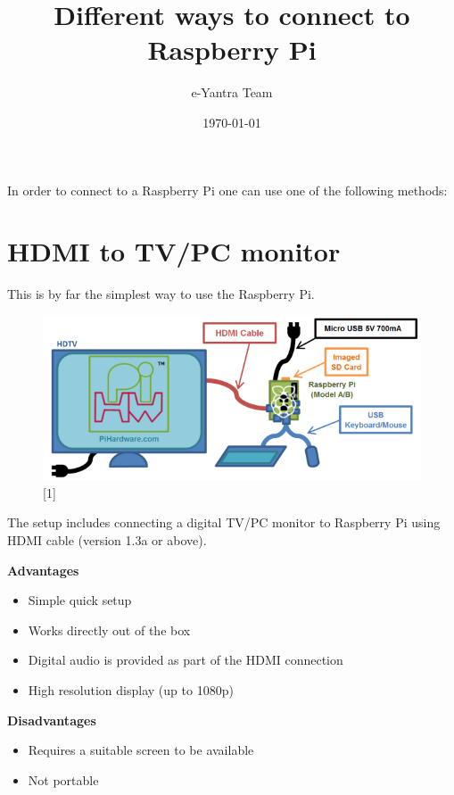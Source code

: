 \documentclass[11pt,a4paper]{article}
\title{Different ways to connect to Raspberry Pi}
\author{e-Yantra Team}
\date{\today}
\begin{document}
	\maketitle
	\newpage
	\tableofcontents
	\newpage
	
	\flushleft
	In order to connect to a Raspberry Pi one can use one of the following methods:
	
	\section{HDMI to TV/PC monitor} 
	This is by far the simplest way to use the Raspberry Pi.
		\begin{figure}[h!]
			\includegraphics[scale=0.5]{tv.png}
			\centering
			\caption{[1]}
		\end{figure}
		     The setup includes connecting a digital TV/PC monitor to Raspberry Pi using HDMI cable (version 1.3a or above).
		     
		     \textbf{Advantages}
			     \begin{itemize}
			     	\item Simple quick setup
			     	\item Works directly out of the box
			     	\item Digital audio is provided as part of the HDMI connection
			     	\item High resolution display (up to 1080p)
			     \end{itemize}
			     
			  \textbf{Disadvantages}
				  \begin{itemize}
					  \item Requires a suitable screen to be available 
					  \item Not portable
				  \end{itemize}
				  
		\newpage
\end{document}
